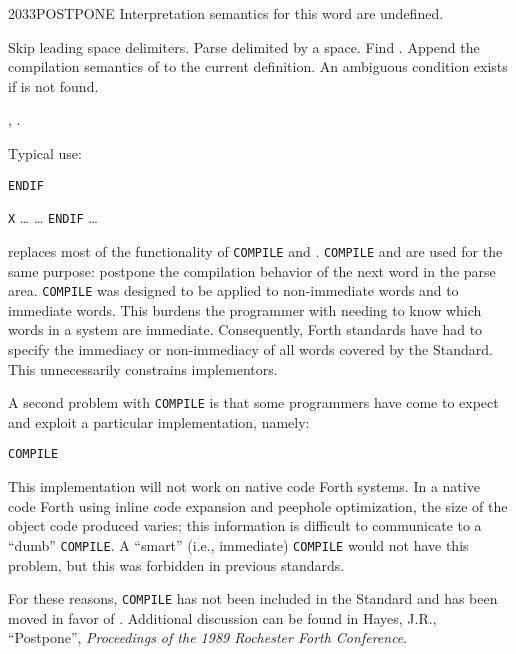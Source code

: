 \begin{worddef}{2033}{POSTPONE}
\interpret
	Interpretation semantics for this word are undefined.

\compile

	Skip leading space delimiters. Parse  delimited by
	a space. Find . Append the compilation semantics of
	 to the current definition. An ambiguous condition
	exists if  is not found.

\see {},
	.

	\begin{rationale} %
		Typical use:

		\tab \word{:} \texttt{ENDIF}
			 
		\word{;} 

		\tab \word{:} \texttt{X} {\ldots}
			 {\ldots} \texttt{ENDIF}
		{\ldots} \word{;}

		 replaces most of the functionality of
		\texttt{COMPILE} and  \word{[COMPILE]}. \texttt{COMPILE} and
	\linebreak
		\word{[COMPILE]} are used for the same purpose: postpone the
		compilation behavior of the next word in the parse area.
		\texttt{COMPILE} was designed to be applied to non-immediate
		words and \word{[COMPILE]} to immediate words. This burdens
		the programmer with needing to know which words in a system
		are immediate. Consequently, Forth standards have had to
		specify the immediacy or non-immediacy of all words covered by
		the Standard. This unnecessarily constrains implementors.

		A second problem with \texttt{COMPILE} is that some
		programmers have come to expect and exploit a particular
		implementation, namely:

		\tab \word{:} \texttt{COMPILE} 
			  \word{,}  
		\word{;}

		This implementation will not work on native code Forth systems.
		In a native code Forth using inline code expansion and peephole
		optimization, the size of the object code produced varies; this
		information is difficult to communicate to a ``dumb''
		\texttt{COMPILE}. A ``smart'' (i.e., immediate) \texttt{COMPILE}
		would not have this problem, but this was forbidden in previous
		standards.

		For these reasons, \texttt{COMPILE} has not been included in
		the Standard and \word{[COMPILE]} has been moved in favor of
		. Additional discussion can be found in Hayes,
		J.R., ``Postpone'', \emph{Proceedings of the 1989 Rochester
		Forth Conference}.
	\end{rationale}


\end{worddef}
